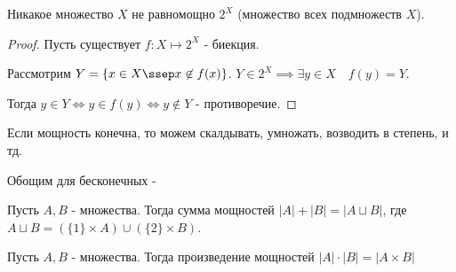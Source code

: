 \begin{theorem} \thmslashn

    Никакое множество $X$ не равномощно $2^{X}$ (множество всех подмножеств $X$).
    \begin{proof} \thmslashn
    
        Пусть существует $f : X \mapsto 2^{X}$ - биекция.

        Рассмотрим $Y = \{x\in X \ssep x \not\in f(x)\} $. $Y\in 2^{X} \implies \exists{y\in X}\quad f(y) = Y$.

        Тогда $y\in Y \iff  y\in f(y) \iff  y \not\in Y$ - противоречие.
    \end{proof}
\end{theorem}

Если мощность конечна, то можем скалдывать, умножать, возводить в степень, и тд.

Обощим для бесконечных - 

\begin{definition} \thmslashn 

    Пусть $A, B$ - множества. Тогда сумма мощностей $|A| + |B| = |A \sqcup B| $, где $A \sqcup B = (\{1\} \times A) \cup (\{2\} \times B)$.
\end{definition}

\begin{definition} \thmslashn 

    Пусть $A, B$ - множества. Тогда произведение мощностей $|A| \cdot |B| = |A \times B|$
\end{definition}

